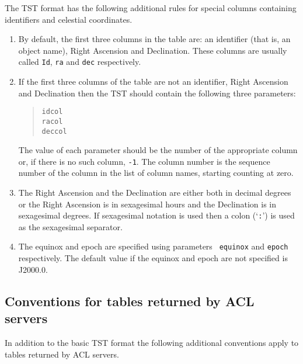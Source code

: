 \documentclass[twoside,11pt]{article}
\renewcommand{\_}{\texttt{\symbol{95}}}
\begin{document}
The TST format has the following additional rules for special columns
containing identifiers and celestial coordinates.

\begin{enumerate}

  \item By default, the first three columns in the table are: an identifier
   (that is, an object name), Right Ascension and Declination.  These
   columns are usually called {\tt Id}, {\tt ra} and {\tt dec}
   respectively.

  \item If the first three columns of the table are not an identifier,
   Right Ascension and Declination then the TST should contain the
   following three parameters:

  \begin{quote}
   {\tt id\_col \\
   ra\_col \\
   dec\_col}
  \end{quote}

   The value of each parameter should be the number of the appropriate
   column or, if there is no such column, {\tt -1}.  The column number is the
   sequence number of the column in the list of column names, starting
   counting at zero.

  \item The Right Ascension and the Declination are either both in
   decimal degrees or the Right Ascension is in sexagesimal hours
   and the Declination is in sexagesimal degrees.  If sexagesimal
   notation is used then a colon (`{\tt :}') is used as the sexagesimal
   separator.

  \item The equinox and epoch are specified using parameters {\tt
   equinox} and {\tt epoch} respectively.  The default value if the
   equinox and epoch are not specified is J2000.0.

\end{enumerate}

\subsection{Conventions for tables returned by ACL servers}

In addition to the basic TST format the following additional conventions
apply to tables returned by ACL servers.
\end{document}
